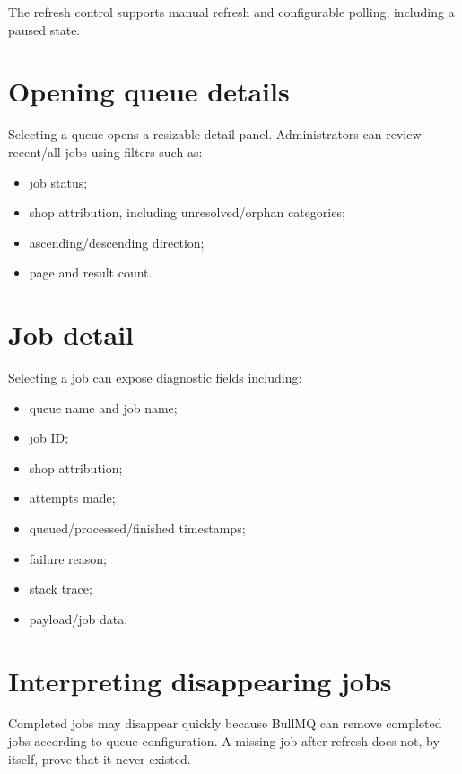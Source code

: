 The refresh control supports manual refresh and configurable polling, including a paused state.

\section{Opening queue details}
Selecting a queue opens a resizable detail panel. Administrators can review recent/all jobs using filters such as:
\begin{itemize}
  \item job status;
  \item shop attribution, including unresolved/orphan categories;
  \item ascending/descending direction;
  \item page and result count.
\end{itemize}


\section{Job detail}
Selecting a job can expose diagnostic fields including:
\begin{itemize}
  \item queue name and job name;
  \item job ID;
  \item shop attribution;
  \item attempts made;
  \item queued/processed/finished timestamps;
  \item failure reason;
  \item stack trace;
  \item payload/job data.
\end{itemize}



\section{Interpreting disappearing jobs}
Completed jobs may disappear quickly because BullMQ can remove completed jobs according to queue configuration. A missing job after refresh does not, by itself, prove that it never existed.

